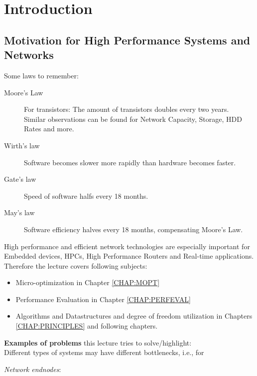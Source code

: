 \chapter{Introduction} \label{CHAP:Introduction}

\section{Motivation for High Performance Systems and Networks}

Some laws to remember:

\begin{description}
	\item[Moore's Law] For transistors: The amount of transistors doubles every two years. \\
	Similar observations can be found for Network Capacity, Storage, HDD Rates and more.
	
	\item[Wirth's law] Software becomes slower more rapidly than hardware becomes faster.
	
	\item[Gate's law] Speed of software halfs every 18 months.
	
	\item[May's law] Software efficiency halves every 18 months, compensating Moore's Law.
\end{description}

High performance and efficient network technologies are especially important for Embedded devices, HPCs, High Performance Routers and Real-time applications.\\

Therefore the lecture covers following subjects:

\begin{itemize}
	\item Micro-optimization in Chapter \ref{CHAP:MOPT}
	\item Performance Evaluation in Chapter \ref{CHAP:PERFEVAL}
	\item Algorithms and Datastructures and degree of freedom utilization in Chapters \ref{CHAP:PRINCIPLES} and following chapters.
\end{itemize}

\textbf{Examples of problems} this lecture tries to solve/highlight:\\

Different types of systems may have different bottlenecks, i.e., for

\textit{Network endnodes}:

